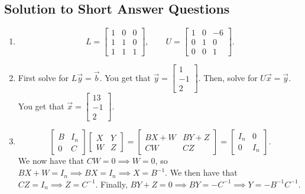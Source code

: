\subsection{Solution to Short Answer Questions}
\begin{enumerate}
	\item \[L = \begin{bmatrix}1 & 0 & 0 \\ 1 & 1 & 0 \\ 1 & 1 & 1\end{bmatrix}, \qquad U = \begin{bmatrix}1 & 0 & -6 \\ 0 & 1 & 0 \\ 0 & 0 & 1\end{bmatrix}.\]
	\item First solve for \(L\vec{y} = \vec{b}\). You get that \(\vec{y} = \begin{bmatrix}1 \\ -1 \\ 2\end{bmatrix}\). Then, solve for \(U\vec{x} = \vec{y}\). You
		get that \(\vec{x} = \begin{bmatrix}13\\ -1 \\ 2\end{bmatrix}\).
	\item \[\begin{bmatrix}B & I_n \\ 0 & C\end{bmatrix}\begin{bmatrix}X & Y \\ W & Z\end{bmatrix} = \begin{bmatrix}BX + W & BY + Z \\ CW & CZ\end{bmatrix} = \begin{bmatrix}I_n & 0 \\ 0 & I_n\end{bmatrix}.\]
		We now have that \(CW = 0 \implies W = 0\), so \(BX + W = I_n \implies BX = I_n \implies X = B^{-1}.\) We then have that \(CZ = I_n \implies Z = 
		C^{-1}\). Finally, \(BY + Z = 0 \implies BY = -C^{-1} \implies Y = -B^{-1}C^{-1}.\)
\end{enumerate}
